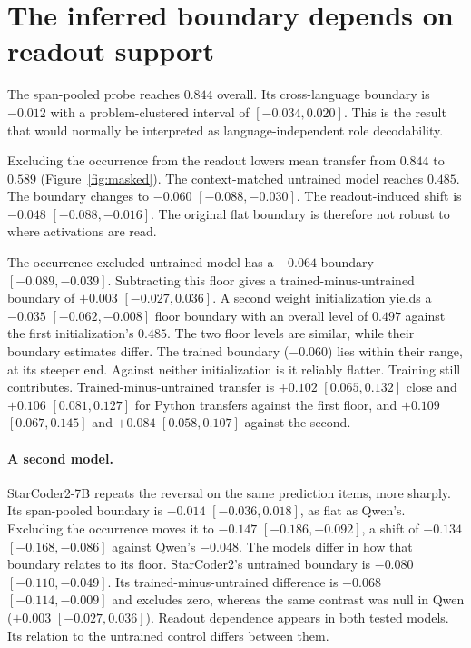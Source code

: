 \documentclass{article}
\begin{document}
\section{The inferred boundary depends on readout support}

The span-pooled probe reaches $0.844$ overall. Its cross-language boundary is
$-0.012$ with a problem-clustered interval of $[-0.034,0.020]$. This is the
result that would normally be interpreted as language-independent role
decodability.

Excluding the occurrence from the readout lowers mean transfer from $0.844$ to
$0.589$ (Figure~\ref{fig:masked}). The context-matched untrained model reaches
$0.485$. The boundary changes to $-0.060$ $[-0.088,-0.030]$. The
readout-induced shift is $-0.048$ $[-0.088,-0.016]$. The original flat
boundary is therefore not robust to where activations are read.

The occurrence-excluded untrained model has a $-0.064$ boundary
$[-0.089,-0.039]$. Subtracting this floor gives a trained-minus-untrained
boundary of $+0.003$ $[-0.027,0.036]$. A second weight initialization yields a
$-0.035$ $[-0.062,-0.008]$ floor boundary with an overall level of $0.497$
against the first initialization's $0.485$. The two floor levels are similar,
while their boundary estimates differ. The trained boundary ($-0.060$) lies
within their range, at its steeper end. Against neither initialization is it
reliably flatter.
Training still contributes. Trained-minus-untrained transfer is $+0.102$
$[0.065,0.132]$ close and $+0.106$ $[0.081,0.127]$ for Python transfers
against the first floor, and $+0.109$ $[0.067,0.145]$ and $+0.084$
$[0.058,0.107]$ against the second.

\paragraph{A second model.} StarCoder2-7B repeats the reversal on the same
prediction items, more sharply. Its span-pooled boundary is $-0.014$
$[-0.036,0.018]$, as flat as Qwen's. Excluding the occurrence moves it to
$-0.147$ $[-0.186,-0.092]$, a shift of $-0.134$ $[-0.168,-0.086]$ against
Qwen's $-0.048$. The models differ in how that boundary relates to its floor.
StarCoder2's untrained boundary is $-0.080$ $[-0.110,-0.049]$. Its
trained-minus-untrained difference is $-0.068$ $[-0.114,-0.009]$ and excludes
zero, whereas the same contrast was null in Qwen ($+0.003$
$[-0.027,0.036]$). Readout dependence appears in both tested models. Its
relation to the untrained control differs between them.
\end{document}
